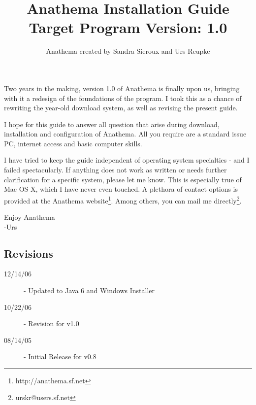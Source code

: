 \documentclass[]{article}
\title{Anathema Installation Guide\\ Target Program Version: 1.0}
\author{Anathema created by Sandra Sieroux and Urs Reupke}
\date{}
\begin{document}
\sffamily
\maketitle
\tableofcontents
\bigskip
Two years in the making, version 1.0 of Anathema is finally upon us, bringing with it a redesign of the foundations of the program. I took this as a chance of rewriting the year-old download system, as well as revising the present guide. 

I hope for this guide to answer all question that arise during download, installation and configuration of Anathema. All you require are a standard issue PC, internet access and basic computer skills.

I have tried to keep the guide independent of operating system specialties - and I failed spectacularly. If anything does not work as written or needs further clarification for a specific system, please let me know. This is especially true of Mac OS X, which I have never even touched. A plethora of contact options is provided at the Anathema website\footnote{http://anathema.sf.net}. Among others, you can mail me directly\footnote{urskr@users.sf.net}.
\begin{flushright}
Enjoy Anathema\\
	-Urs
\end{flushright}

\begin{appendix}
\section*{Revisions}
\begin{description}
\item[12/14/06] - Updated to Java 6 and Windows Installer
\item[10/22/06] - Revision for v1.0
\item[08/14/05] - Initial Release for v0.8
\end{description}
\end{appendix}
\end{document}
